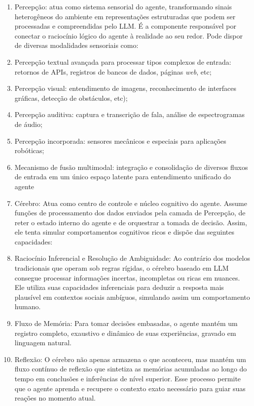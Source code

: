 \documentclass[12pt,oneside,a4paper,brazil,sumario=tradicional]{abntex2}
\begin{document}
\begin{enumerate}
  \item Percepção: atua como sistema sensorial do agente, transformando sinais heterogêneos do ambiente em representações estruturadas que podem ser processadas e compreendidas pelo LLM. É a componente responsável por conectar o raciocínio lógico do agente à realidade ao seu redor. Pode dispor de diversas modalidades sensoriais como:
  \item Percepção textual avançada para processar tipos complexos de entrada: retornos de APIs, registros de bancos de dados, páginas \textit{web}, etc;
  \item Percepção visual: entendimento de imagens,  reconhecimento de interfaces gráficas, detecção de obstáculos, etc);
  \item Percepção auditiva: captura e transcrição de fala, análise de espectrogramas de áudio;
  \item Percepção incorporada: sensores mecânicos e especiais para aplicações robóticas;
  \item Mecanismo de fusão multimodal: integração e consolidação de diversos fluxos de entrada em um único espaço latente para entendimento unificado do agente
  \item Cérebro: Atua como centro de controle e núcleo cognitivo do agente. Assume funções de processamento dos dados enviados pela camada de Percepção, de reter o estado interno do agente e de orquestrar a tomada de decisão. Assim, ele tenta simular comportamentos cognitivos ricos e dispõe das seguintes capacidades:
  \item Raciocínio Inferencial e Resolução de Ambiguidade: Ao contrário dos modelos tradicionais que operam sob regras rígidas, o cérebro baseado em LLM consegue processar informações incertas, incompletas ou ricas em nuances. Ele utiliza suas capacidades inferenciais para deduzir a resposta mais plausível em contextos sociais ambíguos, simulando assim um comportamento humano.
  \item Fluxo de Memória: Para tomar decisões embasadas, o agente mantém um registro completo, exaustivo e dinâmico de suas experiências, gravado em linguagem natural.
  \item Reflexão: O cérebro não apenas armazena o que aconteceu, mas mantém um fluxo contínuo de reflexão que sintetiza as memórias acumuladas ao longo do tempo em conclusões e inferências de nível superior. Esse processo permite que o agente aprenda e recupere o contexto exato necessário para guiar suas reações no momento atual.

\end{enumerate}
\end{document}
